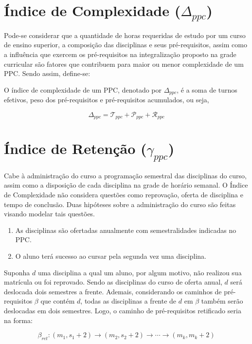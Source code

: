 \documentclass[a4paper, 12pt]{article}
\begin{document}
\section*{Índice de Complexidade ($\Delta_{ppc}$)}
Pode-se considerar que a quantidade de horas requeridas de estudo por um curso de ensino superior, a composição das disciplinas e seus pré-requisitos, assim 
como a influência que exercem os pré-requisitos na integralização proposto na grade curricular são fatores que contribuem para maior ou menor complexidade 
de um PPC. Sendo assim, define-se: 

\begin{definicao}
O índice de complexidade de um PPC, denotado por $\Delta_{ppc}$, é a soma de turnos efetivos, peso dos pré-requisitos e pré-requisitos acumulados, ou seja,

$$\Delta_{ppc} = \mathcal{T}_{ppc} + \mathcal{P}_{ppc} + \mathcal{R}_{ppc}$$
\end{definicao}

\section*{Índice de Retenção ($\gamma_{ppc}$)}

Cabe à administração do curso a programação semestral das disciplinas do curso, assim como a disposição de cada disciplina na grade de horário semanal. O 
Índice de Complexidade não considera questões como reprovação, oferta de disciplina e tempo de conclusão. Duas hipóteses sobre a administração do curso 
são feitas visando modelar tais questões.

\begin{enumerate}
\item As disciplinas são ofertadas anualmente com semestralidades indicadas no PPC.
\item O aluno terá sucesso ao cursar pela segunda vez uma disciplina. 
\end{enumerate}

Suponha $d$ uma disciplina a qual um aluno, por algum motivo, não realizou sua matrícula ou foi reprovado. Sendo as disciplinas do curso de oferta anual, 
$d$ será deslocada dois semestres a frente. Ademais, considerando os caminhos de pré-requisitos $\beta$ que contém $d$, todas as disciplinas a frente de 
$d$ em $\beta$ também serão deslocadas em dois semestres. Logo, o caminho de pré-requisitos retificado seria na forma:

$$ \beta_{ret}: (m_1, s_1 + 2) \rightarrow (m_2, s_2 + 2) \rightarrow \cdots \rightarrow (m_k, m_k +2) $$
\end{document}

